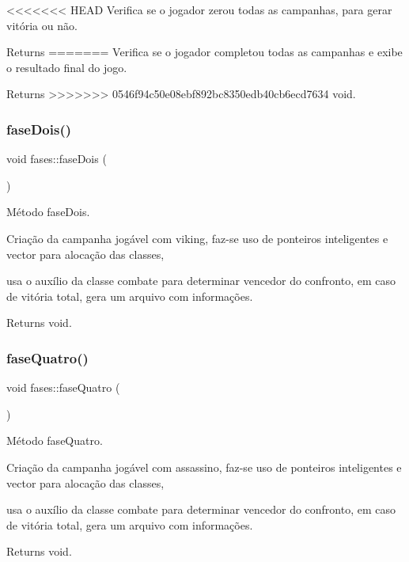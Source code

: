 <<<<<<< HEAD
Verifica se o jogador zerou todas as campanhas, para gerar vitória ou não. \begin{DoxyReturn}{Returns}
=======
Verifica se o jogador completou todas as campanhas e exibe o resultado final do jogo. \begin{DoxyReturn}{Returns}
>>>>>>> 0546f94c50e08ebf892bc8350edb40cb6ecd7634
void. 
\end{DoxyReturn}
\mbox{\label{classfases_a2f19632bd94eacd6c5437a2774bc529f}} 
\subsubsection{\texorpdfstring{fase\+Dois()}{faseDois()}}
{\footnotesize\ttfamily void fases\+::fase\+Dois (\begin{DoxyParamCaption}{ }\end{DoxyParamCaption})}



Método fase\+Dois. 

Criação da campanha jogável com viking, faz-\/se uso de ponteiros inteligentes e vector para alocação das classes,

usa o auxílio da classe combate para determinar vencedor do confronto, em caso de vitória total, gera um arquivo com informações. \begin{DoxyReturn}{Returns}
void. 
\end{DoxyReturn}
\mbox{\label{classfases_af33d3aefdf442b1ea726645b0c946d78}} 
\subsubsection{\texorpdfstring{fase\+Quatro()}{faseQuatro()}}
{\footnotesize\ttfamily void fases\+::fase\+Quatro (\begin{DoxyParamCaption}{ }\end{DoxyParamCaption})}



Método fase\+Quatro. 

Criação da campanha jogável com assassino, faz-\/se uso de ponteiros inteligentes e vector para alocação das classes,

usa o auxílio da classe combate para determinar vencedor do confronto, em caso de vitória total, gera um arquivo com informações. \begin{DoxyReturn}{Returns}
void. 
\end{DoxyReturn}
\mbox{\label{classfases_a05138769008d5c7d1b548916ecfa9f34}} 

\end{DoxyReturn}
